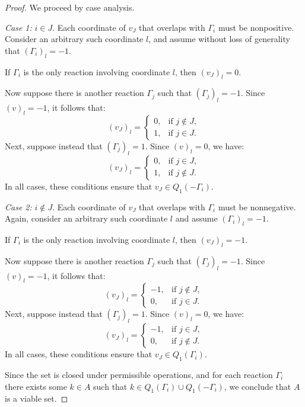 \documentclass[10pt,a4paper]{amsart}
\begin{document}
\begin{proof}
We proceed by case analysis.

\textit{Case 1:} \( i \in J \).  
Each coordinate of \( v_J \) that overlaps with \( \Gamma_i \) must be nonpositive. Consider an arbitrary such coordinate \( l \), and assume without loss of generality that \( (\Gamma_i)_l = -1 \).

If \( \Gamma_i \) is the only reaction involving coordinate \( l \), then \( (v_J)_l = 0 \).

Now suppose there is another reaction \( \Gamma_j \) such that \( (\Gamma_j)_l = -1 \). Since \( (v)_l = -1 \), it follows that:
\[
(v_J)_l =
\begin{cases}
0, & \text{if } j \notin J, \\
1, & \text{if } j \in J.
\end{cases}
\]
Next, suppose instead that \( (\Gamma_j)_l = 1 \). Since \( (v)_l = 0 \), we have:
\[
(v_J)_l =
\begin{cases}
0, & \text{if } j \in J, \\
1, & \text{if } j \notin J.
\end{cases}
\]
In all cases, these conditions ensure that \( v_J \in Q_1(-\Gamma_i) \).

\textit{Case 2:} \( i \notin J \).  
Each coordinate of \( v_J \) that overlaps with \( \Gamma_i \) must be nonnegative. Again, consider an arbitrary such coordinate \( l \) and assume \( (\Gamma_i)_l = -1 \).

If \( \Gamma_i \) is the only reaction involving coordinate \( l \), then \( (v_J)_l = -1 \).

Now suppose there is another reaction \( \Gamma_j \) such that \( (\Gamma_j)_l = -1 \). Since \( (v)_l = -1 \), it follows that:
\[
(v_J)_l =
\begin{cases}
-1, & \text{if } j \notin J, \\
0, & \text{if } j \in J.
\end{cases}
\]
Next, suppose instead that \( (\Gamma_j)_l = 1 \). Since \( (v)_l = 0 \), we have:
\[
(v_J)_l =
\begin{cases}
-1, & \text{if } j \in J, \\
0, & \text{if } j \notin J.
\end{cases}
\]
In all cases, these conditions ensure that \( v_J \in Q_1(\Gamma_i) \).

Since the set is closed under permissible operations, and for each reaction \( \Gamma_i \) there exists some \( k \in A \) such that \( k \in Q_1(\Gamma_i) \cup Q_1(-\Gamma_i) \), we conclude that \( A \) is a viable set.
 \end{proof}
\end{document}
